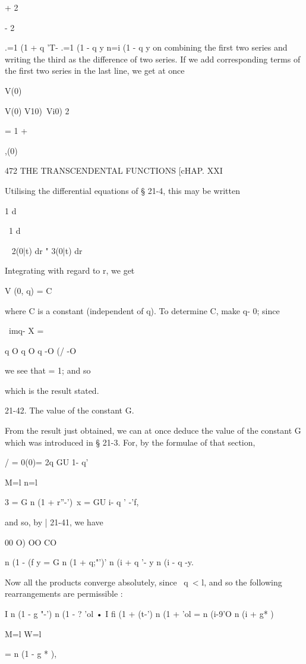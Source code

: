 + 2

- 2

.=1 (1 + q 'T- .=1 (1 - q y n=i (1 - q y on combining the first two
series and writing the third as the difference of two series. If we
add corresponding terms of the first two series in the last line, we
get at once

V(0)

 V(0) V10)\ Vi0) 2

= 1 +

,(0) %

472 THE TRANSCENDENTAL FUNCTIONS [cHAP. XXI

Utilising the differential equations of § 21-4, this may be written

1 d%

\ 1 d%

~ 2(0|t) dr " 3(0|t) dr %

Integrating with regard to r, we get

V (0, q) = C%

where C is a constant (independent of q). To determine C, make q- 0;
since

\ imq- X = %

q O q O q -O (/ -O

we see that = 1; and so

which is the result stated.

21-42. The value of the constant G.

From the result just obtained, we can at once deduce the value of the
constant G which was introduced in § 21-3. For, by the formulae of
that section,

 / = 0(0)= 2q GU 1- q' %

M=l n=l

 3 = G n (1 + r''-')\ x = GU i- q ' -'f,

and so, by | 21-41, we have

00 O) OO CO

n (1 - (f y = G n (1 + q;"')' n (i + q '- y n (i - q -y.

Now all the products converge absolutely, since \ q\ < l, and so the
following rearrangements are permissible :

I n (1 - g "-') n (1 - ? 'ol • I fi (1 + (t-') n (1 + 'ol = n (i-9'O n
(i + g* )

M=l W=l

= n (1 - g * ),


